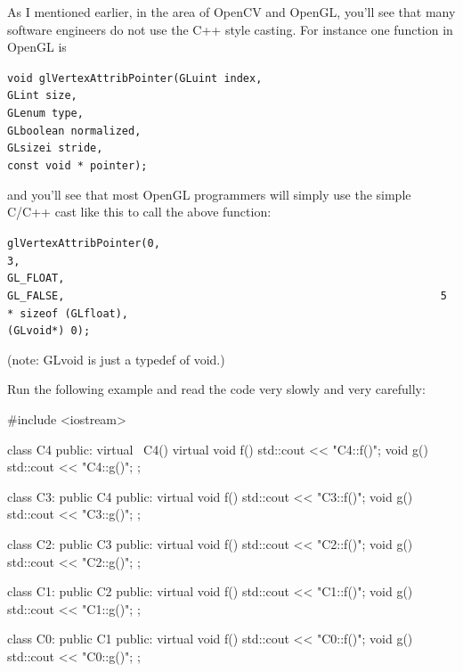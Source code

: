 \begin{consolethree}[escapeinside=||]
As I mentioned earlier, in the area of OpenCV and OpenGL, you'll see
that many software engineers do not use the C++ style casting. For
instance one function in OpenGL is
\begin{center}
\verb!void glVertexAttribPointer(GLuint index,                                                                   GLint size,                                                                     GLenum type,                                                                    GLboolean normalized,                                                           GLsizei stride,                                                                 const void * pointer);!
\end{center}
and you'll see that most OpenGL programmers will simply use the simple
C/C++ cast like this to call the above function:
\begin{center}
\verb!glVertexAttribPointer(0,                                                                              3,                                                                       GL_FLOAT,                                                                       GL_FALSE,                                                           5 * sizeof (GLfloat),                                                                   (GLvoid*) 0);!
\end{center}

(note: GLvoid is just a typedef of void.)

\newpage{}

Run the following  example and read the code very slowly and very carefully:

\begin{console}
#include <iostream>

class C4
{
public:
     virtual ~C4() {}
     virtual void f() { std::cout << "C4::f()\n"; }
     void g() { std::cout << "C4::g()\n"; }
};

class C3: public C4
{
public:
     virtual void f() { std::cout << "C3::f()\n"; }
     void g() { std::cout << "C3::g()\n"; }
};

class C2: public C3
{
public:
     virtual void f() { std::cout << "C2::f()\n"; }
     void g() { std::cout << "C2::g()\n"; }
};

class C1: public C2
{
public:
     virtual void f() { std::cout << "C1::f()\n"; }
     void g() { std::cout << "C1::g()\n"; }
};

class C0: public C1
{
public:
     virtual void f() { std::cout << "C0::f()\n"; }
     void g() { std::cout << "C0::g()\n"; }
};


\end{console}
\end{consolethree}

